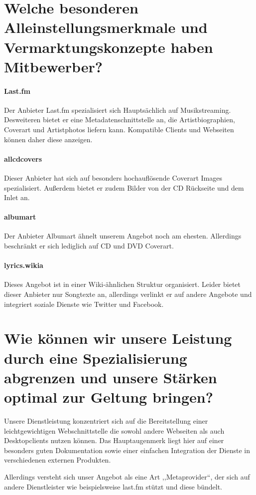\documentclass[11pt]{scrreprt}
\begin{document}
\section{Welche besonderen Alleinstellungsmerkmale und
Vermarktungskonzepte haben Mitbewerber?}

\paragraph{Last.fm}
Der Anbieter Last.fm spezialisiert sich Hauptsächlich auf Musikstreaming.
Desweiteren bietet er eine Metadatenschnittstelle an, die Artistbiographien,
Coverart und Artistphotos liefern kann. Kompatible Clients und Webseiten können
daher diese anzeigen.


\paragraph{allcdcovers}
Dieser Anbieter hat sich auf besonders hochauflösende Coverart Images
spezialisiert. Außerdem bietet er zudem Bilder von der CD Rückseite und dem
Inlet an.

\paragraph{albumart}
Der Anbieter Albumart ähnelt unserem Angebot noch am ehesten. Allerdings
beschränkt er sich lediglich auf CD und DVD Coverart.


\paragraph{lyrics.wikia}
Dieses Angebot ist in einer Wiki-ähnlichen Struktur organisiert. Leider bietet
dieser Anbieter nur Songtexte an, allerdings verlinkt er auf andere Angebote und
integriert soziale Dienste wie Twitter und Facebook.


\section{Wie können wir unsere Leistung durch eine
Spezialisierung abgrenzen und unsere Stärken
optimal zur Geltung bringen?}
Unsere Dienstleistung konzentriert sich auf die Bereitstellung einer
leichtgewichtigen Webschnittstelle die sowohl andere Webseiten als auch
Desktopclients nutzen können. Das Hauptaugenmerk liegt hier auf einer besonders
guten Dokumentation sowie einer einfachen Integration der Dienste in
verschiedenen externen Produkten.

Allerdings versteht sich unser Angebot als eine Art ,,Metaprovider``, der sich
auf andere Dienstleister wie beispielsweise last.fm stützt und diese bündelt.
\end{document}
